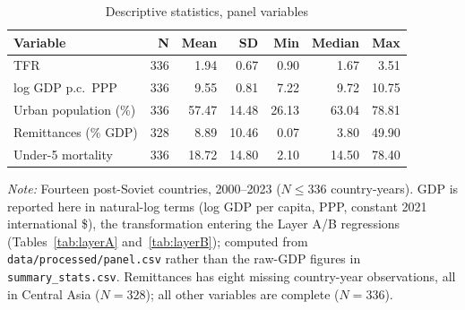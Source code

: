 \begin{table}[htbp]
\centering
\caption{Descriptive statistics, panel variables}
\label{tab:summary_stats}
\small
\begin{tabular}{lrrrrrr}
\toprule
Variable & N & Mean & SD & Min & Median & Max \\
\midrule
TFR                        & 336 & 1.94 & 0.67 & 0.90 & 1.67 & 3.51 \\
log GDP p.c.\ PPP          & 336 & 9.55 & 0.81 & 7.22 & 9.72 & 10.75 \\
Urban population (\%)      & 336 & 57.47 & 14.48 & 26.13 & 63.04 & 78.81 \\
Remittances (\% GDP)       & 328 & 8.89 & 10.46 & 0.07 & 3.80 & 49.90 \\
Under-5 mortality          & 336 & 18.72 & 14.80 & 2.10 & 14.50 & 78.40 \\
\bottomrule
\end{tabular}

\begin{minipage}{\textwidth}\footnotesize
\vspace{4pt}
\emph{Note:} Fourteen post-Soviet countries, 2000--2023 ($N \leq 336$ country-years).
GDP is reported here in natural-log terms (log GDP per capita, PPP, constant 2021
international \$), the transformation entering the Layer A/B regressions
(Tables~\ref{tab:layerA} and~\ref{tab:layerB}); computed from
\texttt{data/processed/panel.csv} rather than the raw-GDP figures in
\texttt{summary\_stats.csv}. Remittances has eight missing country-year
observations, all in Central Asia ($N=328$); all other variables are complete
($N=336$).
\end{minipage}
\end{table}
